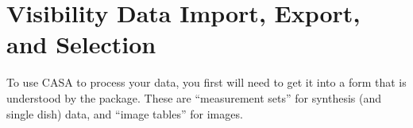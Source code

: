 

\chapter{Visibility Data Import, Export, and Selection}
\label{chapter:io} 

To use CASA to process your data, you first will need to get it
into a form that is understood by the package.  These are 
``measurement sets'' for synthesis (and single dish) data, and
``image tables'' for images.

